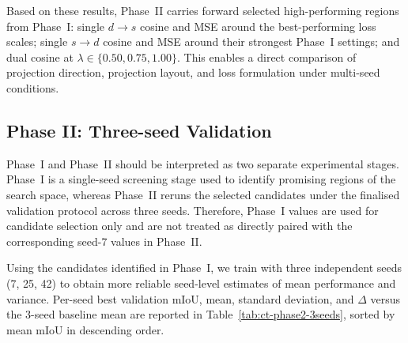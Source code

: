 Based on these results, Phase~II carries forward selected high-performing
regions from Phase~I: single $d{\rightarrow}s$ cosine and MSE around the
best-performing loss scales; single $s{\rightarrow}d$ cosine and MSE
around their strongest Phase~I settings; and dual cosine at
$\lambda \in \{0.50, 0.75, 1.00\}$. This enables a direct comparison of
projection direction, projection layout, and loss formulation under
multi-seed conditions.

\subsection{Phase II: Three-seed Validation}
\label{subsec:ct-phase2-3seeds}

\noindent
Phase~I and Phase~II should be interpreted as two separate experimental
stages. Phase~I is a single-seed screening stage used to identify promising
regions of the search space, whereas Phase~II reruns the selected
candidates under the finalised validation protocol across three seeds.
Therefore, Phase~I values are used for candidate selection only and are not
treated as directly paired with the corresponding seed-7 values in
Phase~II.

Using the candidates identified in Phase~I, we train with three
independent seeds (7, 25, 42) to obtain more reliable seed-level estimates
of mean performance and variance. Per-seed best validation mIoU, mean,
standard deviation, and $\Delta$ versus the 3-seed baseline mean are
reported in Table~\ref{tab:ct-phase2-3seeds}, sorted by mean mIoU in
descending order.

